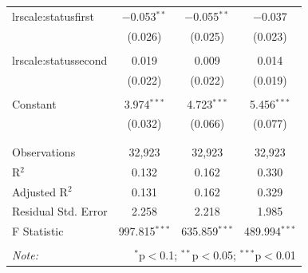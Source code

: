 \begin{table}[!htbp]
\begin{tabular}{@{\extracolsep{5pt}}lccc}
 lrscale:statusfirst & $-$0.053$^{**}$ & $-$0.055$^{**}$ & $-$0.037 \\ 
  & (0.026) & (0.025) & (0.023) \\ 
  & & & \\ 
 lrscale:statussecond & 0.019 & 0.009 & 0.014 \\ 
  & (0.022) & (0.022) & (0.019) \\ 
  & & & \\ 
 Constant & 3.974$^{***}$ & 4.723$^{***}$ & 5.456$^{***}$ \\ 
  & (0.032) & (0.066) & (0.077) \\ 
  & & & \\ 
\hline \\[-1.8ex] 
Observations & 32,923 & 32,923 & 32,923 \\ 
R$^{2}$ & 0.132 & 0.162 & 0.330 \\ 
Adjusted R$^{2}$ & 0.131 & 0.162 & 0.329 \\ 
Residual Std. Error & 2.258 & 2.218 & 1.985 \\ 
F Statistic & 997.815$^{***}$ & 635.859$^{***}$ & 489.994$^{***}$ \\ 
\hline 
\hline \\[-1.8ex] 
\textit{Note:}  & \multicolumn{3}{r}{$^{*}$p$<$0.1; $^{**}$p$<$0.05; $^{***}$p$<$0.01} \\ 
\end{tabular} 
\end{table} 
